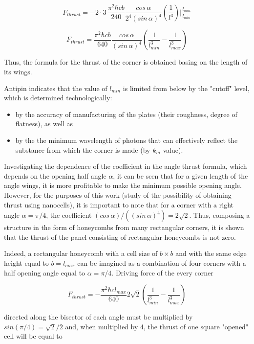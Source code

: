 \documentclass[11pt]{article}
\begin{document}
\[F_{thrust} = -2\cdot3\, \frac{\pi^2\hbar c b}{240} \frac{cos\, \alpha}{2^4\left(sin\, \alpha\right)^4} \left(\frac{1}{l^3}\right)\Bigg\rvert_{\,l_{min}}^{\,l_{max}} \]

\[F_{thrust} = \frac{\pi^2\hbar c b}{640} \frac{cos\, \alpha}{\left(sin\, \alpha\right)^4} \left(\frac{1}{l_{min}^3} - \frac{1}{l_{max}^3}\right)\]

Thus, the formula for the thrust of the corner is obtained basing on the
length of its wings.

Antipin indicates that the value of \(l_{min}\) is limited from below by
the "cutoff" level, which is determined technologically:

\begin{itemize}
\item
  by the accuracy of manufacturing of the plates (their roughness,
  degree of flatness), as well as
\item
  by the the minimum wavelength of photons that can effectively reflect
  the substance from which the corner is made (by \(k_m\) value).
\end{itemize}

    Investigating the dependence of the coefficient in the angle thrust
formula, which depends on the opening half angle \(\alpha\), it can be
seen that for a given length of the angle wings, it is more profitable
to make the minimum possible opening angle. However, for the purposes of
this work (study of the possibility of obtaining thrust using
nanocells), it is important to note that for a corner with a right angle
\(\alpha = {\pi}/{4}\), the coefficient
\(\left({cos\, \alpha}\right)\big/\left({\left(sin\, \alpha\right)^4}\right) = 2\sqrt{2}\).
Thus, composing a structure in the form of honeycombs from many
rectangular corners, it is shown that the thrust of the panel consisting
of rectangular honeycombs is not zero.

Indeed, a rectangular honeycomb with a cell size of \(b \times b\) and
with the same edge height equal to \(b = l_{max}\) can be imagined as a
combination of four corners with a half opening angle equal to
\(\alpha = {\pi}/{4}\). Driving force of the every corner

\[F_{thrust} = - \frac{\pi^2\hbar c l_{max}}{640} 2\sqrt{2} \left(\frac{1}{l_{min}^3} - \frac{1}{l_{max}^3}\right)\]

directed along the bisector of each angle must be multiplied by
\(sin\left({\pi}/{4}\right)={\sqrt{2}}\big/{2}\) and, when multiplied by
4, the thrust of one square "opened" cell will be equal to
\end{document}
